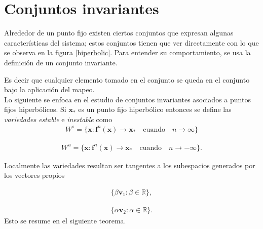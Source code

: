 \section{Conjuntos invariantes}
Alrededor de un punto fijo existen ciertos conjuntos que expresan algunas ca\-rac\-te\-rís\-ti\-cas del sistema; estos conjuntos tienen que ver directamente con lo que se observa en la figura \ref{hiperbolic}. Para entender su comportamiento, se usa la definición de un conjunto invariante.

Es decir que cualquier elemento tomado en el conjunto se queda en el conjunto bajo la aplicación del mapeo. \\

Lo siguiente se enfoca en el estudio de conjuntos invariantes asociados a puntos fijos hiperbólicos. Si $\mathbf{x}_{*}$ es un punto fijo hiperbólico entonces se define las \textit{variedades estable} e \textit{inestable} como
\begin{eqnarray}
W^{s}=\lbrace \mathbf{x} : \mathbf{f}^{n}(\mathbf{x})\rightarrow \mathbf{x}_{*} \quad \mathrm{cuando} \quad n\rightarrow \infty \rbrace
\label{variedad estable}
\end{eqnarray}

\begin{eqnarray}
W^{u}=\lbrace \mathbf{x} : \mathbf{f}^{n}(\mathbf{x})\rightarrow \mathbf{x}_{*} \quad \mathrm{cuando} \quad n\rightarrow -\infty \rbrace.
\label{variedad inestable}
\end{eqnarray}


Localmente las variedades resultan ser tangentes a los subespacios generados por los vectores propios

\begin{eqnarray*}
\lbrace \beta \pmb v_{1} : \beta\in \mathbb{R} \rbrace,
\end{eqnarray*}

\begin{eqnarray*}
\lbrace \alpha \pmb v_{2} : \alpha\in \mathbb{R}\rbrace.
\end{eqnarray*}
Esto se resume en el siguiente teorema.







